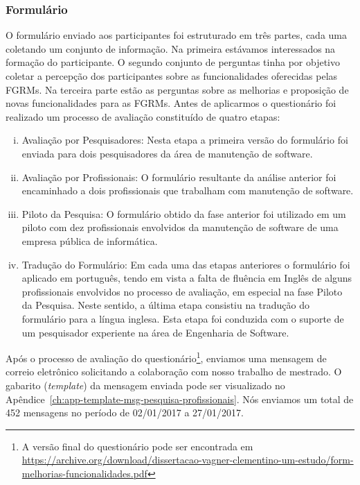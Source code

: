 \subsubsection{Formulário}\label{subsubsec:questionario}

O formulário enviado aos participantes foi estruturado em três partes, cada uma
coletando um conjunto de informação. Na primeira estávamos interessados na
formação do participante. O segundo conjunto de perguntas tinha por objetivo
coletar a percepção dos participantes sobre as funcionalidades oferecidas pelas
FGRMs\@. Na terceira parte estão as perguntas sobre as melhorias e proposição de
novas funcionalidades para as FGRMs. Antes de aplicarmos o questionário foi
realizado um processo de avaliação constituído de quatro etapas:

\begin{enumerate}[(i)]
	\item Avaliação por Pesquisadores: Nesta etapa a primeira versão do
		formulário foi enviada para dois pesquisadores da área de manutenção de
		software.
	\item Avaliação por Profissionais: O formulário resultante da análise
		anterior foi encaminhado a dois profissionais que trabalham com
		manutenção de software.
	\item Piloto da Pesquisa: O formulário obtido da fase anterior foi utilizado
		em um piloto com dez profissionais envolvidos da manutenção de software
		de uma empresa pública de informática.
	\item Tradução do Formulário: Em cada uma das etapas anteriores o
		formulário foi aplicado em português, tendo em vista a falta de fluência
		em Inglês de alguns profissionais envolvidos no processo de avaliação,
		em especial na fase Piloto da Pesquisa. Neste sentido, a última etapa
		consistiu na tradução do formulário para a língua inglesa. Esta etapa
		foi conduzida com  o suporte de um pesquisador experiente na área de
		Engenharia de Software.
\end{enumerate}

Após o processo de avaliação do questionário\footnote{A versão final do
    questionário pode ser encontrada em
    \url{https://archive.org/download/dissertacao-vagner-clementino-um-estudo/form-melhorias-funcionalidades.pdf}},
enviamos uma mensagem de correio eletrônico solicitando a colaboração com nosso
trabalho de mestrado. O gabarito (\textit{template}) da mensagem enviada pode
ser visualizado no Apêndice~\ref{ch:app-template-msg-pesquisa-profissionais}. Nós
enviamos um total de 452 mensagens no período de 02/01/2017 a 27/01/2017.

